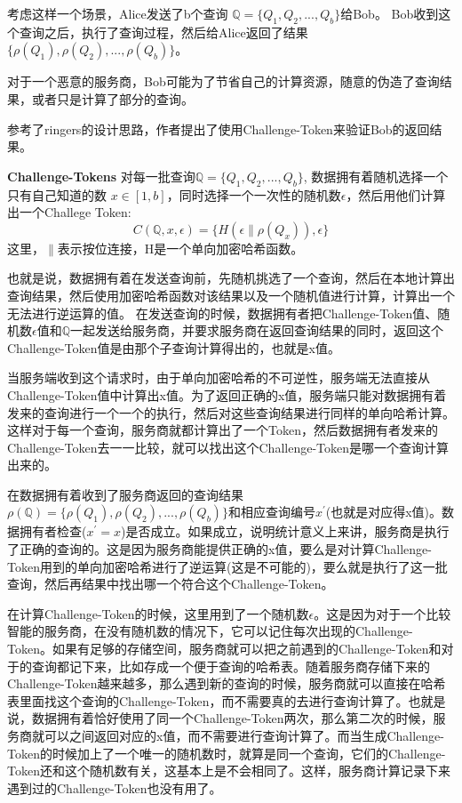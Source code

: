 考虑这样一个场景，Alice发送了b个查询 $\mathbb{Q} = \{Q_1, Q_2, ... ,Q_b\}$给Bob。
Bob收到这个查询之后，执行了查询过程，然后给Alice返回了结果$\{\rho(Q_1), \rho(Q_2), ..., \rho(Q_b)\}$。

对于一个恶意的服务商，Bob可能为了节省自己的计算资源，随意的伪造了查询结果，或者只是计算了部分的查询。

参考了ringers的设计思路，作者提出了使用Challenge-Token来验证Bob的返回结果。

\textbf{Challenge-Tokens} 对每一批查询$\mathbb{Q} = \{Q_1, Q_2, ... ,Q_b\}$, 数据拥有着随机选择一个只有自己知道的数 $x \in [1, b]$，同时选择一个一次性的随机数$\epsilon$，然后用他们计算出一个Challege Token:
\begin{equation} C(\mathbb{Q}, x, \epsilon) = \{H(\epsilon \parallel \rho(Q_x)), \epsilon\}\end{equation}
这里，$\parallel$表示按位连接，H是一个单向加密哈希函数。

也就是说，数据拥有着在发送查询前，先随机挑选了一个查询，然后在本地计算出查询结果，然后使用加密哈希函数对该结果以及一个随机值进行计算，计算出一个无法进行逆运算的值。
在发送查询的时候，数据拥有者把Challenge-Token值、随机数$\epsilon$值和$\mathbb{Q}$一起发送给服务商，并要求服务商在返回查询结果的同时，返回这个Challenge-Token值是由那个子查询计算得出的，也就是x值。

当服务端收到这个请求时，由于单向加密哈希的不可逆性，服务端无法直接从Challenge-Token值中计算出x值。为了返回正确的x值，服务端只能对数据拥有着发来的查询进行一个一个的执行，然后对这些查询结果进行同样的单向哈希计算。这样对于每一个查询，服务商就都计算出了一个Token，然后数据拥有者发来的Challenge-Token去一一比较，就可以找出这个Challenge-Token是哪一个查询计算出来的。

在数据拥有着收到了服务商返回的查询结果$\rho(\mathbb{Q}) = \{\rho(Q_1), \rho(Q_2), ..., \rho(Q_b)\}$和相应查询编号$x^\prime$(也就是对应得x值)。数据拥有者检查($x^\prime = x$)是否成立。如果成立，说明统计意义上来讲，服务商是执行了正确的查询的。这是因为服务商能提供正确的x值，要么是对计算Challenge-Token用到的单向加密哈希进行了逆运算(这是不可能的)，要么就是执行了这一批查询，然后再结果中找出哪一个符合这个Challenge-Token。

在计算Challenge-Token的时候，这里用到了一个随机数$\epsilon$。这是因为对于一个比较智能的服务商，在没有随机数的情况下，它可以记住每次出现的Challenge-Token。如果有足够的存储空间，服务商就可以把之前遇到的Challenge-Token和对于的查询都记下来，比如存成一个便于查询的哈希表。随着服务商存储下来的Challenge-Token越来越多，那么遇到新的查询的时候，服务商就可以直接在哈希表里面找这个查询的Challenge-Token，而不需要真的去进行查询计算了。也就是说，数据拥有着恰好使用了同一个Challenge-Token两次，那么第二次的时候，服务商就可以之间返回对应的x值，而不需要进行查询计算了。而当生成Challenge-Token的时候加上了一个唯一的随机数时，就算是同一个查询，它们的Challenge-Token还和这个随机数有关，这基本上是不会相同了。这样，服务商计算记录下来遇到过的Challenge-Token也没有用了。

